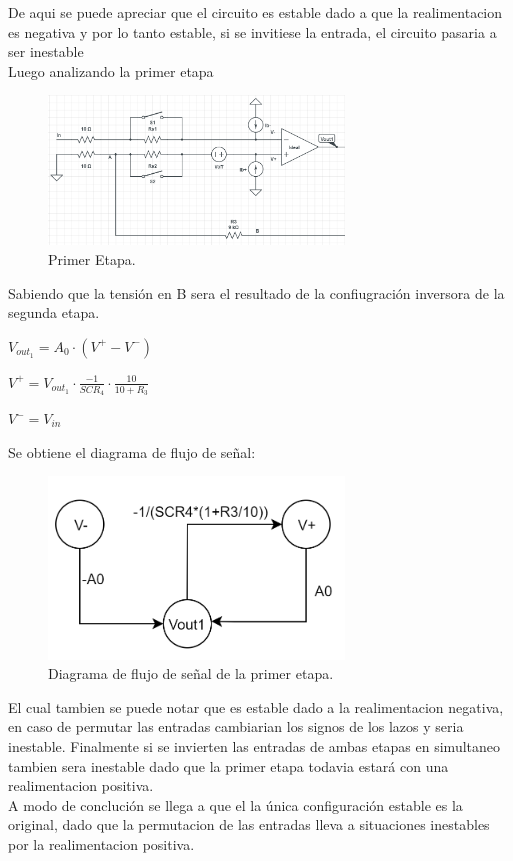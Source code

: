\documentclass[a4paper]{article}
\begin{document}
De aqui se puede apreciar que el circuito es estable dado a que la realimentacion es negativa y por lo tanto estable, si se invitiese la entrada, el circuito pasaria a ser inestable\\
Luego analizando la primer etapa
\begin{figure}[H]	
	\centering
	\includegraphics[width=0.7\textwidth]{imagenes/PrimeraEtapa.PNG}
	\caption{Primer Etapa.}
	\label{fig:PrimerEtapa}
\end{figure}
Sabiendo que la tensión en B sera el resultado de la confiugración inversora de la segunda etapa.\\
\begin{center}$V_{out_1}=A_0 \cdot (V^+ - V^-)$\\\end{center}
\begin{center}$V^+= V_{out_1}\cdot \frac{-1}{SCR_4} \cdot \frac{10}{10+R_3} $\\\end{center}
\begin{center}$V^- = V_{in}$\\\end{center}
Se obtiene el diagrama de flujo de señal:
\begin{figure}[H]	
	\centering
	\includegraphics[width=0.7\textwidth]{imagenes/PrimerEtapaDiagrama.PNG}
	\caption{Diagrama de flujo de señal de la primer etapa.}
	\label{fig:PrimerEtapaDiagrama}
\end{figure}
El cual tambien se puede notar que es estable dado a la realimentacion negativa, en caso de permutar las entradas cambiarian los signos de los lazos y seria inestable.
Finalmente si se invierten las entradas de ambas etapas en simultaneo tambien sera inestable dado que la primer etapa todavia estará con una realimentacion positiva.\\
A modo de conclución se llega a que el la única configuración estable es la original, dado que la permutacion de las entradas lleva a situaciones inestables por la realimentacion positiva.
\end{document}

